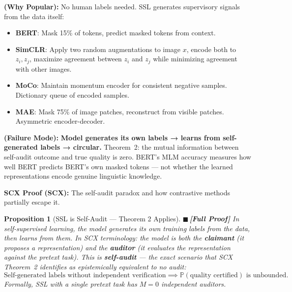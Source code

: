 \documentclass[12pt,a4paper]{article}
\newtheorem{proposition}[theorem]{Proposition}
\theoremstyle{definition}
\newcommand{\rigorFull}{{\color{rigorcolor}$\blacksquare$\,\textbf{[Full Proof]}}}
\newcommand{\SCX}{\textsc{SCX}}
\newcommand{\Pbb}{\mathbb{P}}
\newcommand{\whyPopular}{\noindent\textbf{ (Why Popular):} }
\newcommand{\whyFail}{\noindent\textbf{ (Failure Mode):} }
\newcommand{\scxProof}{\noindent\textbf{SCX Proof (SCX):} }
\begin{document}
\whyPopular{} No human labels needed. SSL generates supervisory signals from the data itself:
\begin{itemize}[nosep]
    \item \textbf{BERT}: Mask 15\% of tokens, predict masked tokens from context.
    \item \textbf{SimCLR}: Apply two random augmentations to image $x$, encode both to $z_i, z_j$, maximize agreement between $z_i$ and $z_j$ while minimizing agreement with other images.
    \item \textbf{MoCo}: Maintain momentum encoder for consistent negative samples. Dictionary queue of encoded samples.
    \item \textbf{MAE}: Mask 75\% of image patches, reconstruct from visible patches. Asymmetric encoder-decoder.
\end{itemize}

\whyFail{} \textbf{Model generates its own labels → learns from self-generated labels → circular.} Theorem~2: the mutual information between self-audit outcome and true quality is zero. BERT's MLM accuracy measures how well BERT predicts BERT's own masked tokens — not whether the learned representations encode genuine linguistic knowledge.

\scxProof{} The self-audit paradox and how contrastive methods partially escape it.

\begin{proposition}[SSL is Self-Audit — Theorem 2 Applies]\label{prop:ssl_selfaudit}
\rigorFull
In self-supervised learning, the model generates its own training labels from the data, then learns from them. In \SCX{} terminology: the model is both the \textbf{claimant} (it proposes a representation) and the \textbf{auditor} (it evaluates the representation against the pretext task). This is \textbf{self-audit} — the exact scenario that \SCX{} Theorem~2 identifies as epistemically equivalent to no audit:
\begin{equation}\label{eq:ssl_thm2}
    \text{Self-generated labels without independent verification} \implies \Pbb(\text{quality certified}) \text{ is unbounded.}
\end{equation}
Formally, SSL with a single pretext task has $M=0$ independent auditors.
\end{proposition}
\end{document}
